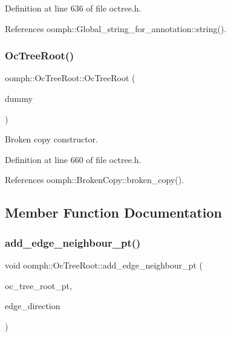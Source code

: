 Definition at line 636 of file octree.\+h.



References oomph\+::\+Global\+\_\+string\+\_\+for\+\_\+annotation\+::string().

\mbox{\label{classoomph_1_1OcTreeRoot_aa32ff5989a11da4c0a6f884f81833ef9}} 
\subsubsection{\texorpdfstring{Oc\+Tree\+Root()}{OcTreeRoot()}\hspace{0.1cm}{\footnotesize\ttfamily [2/2]}}
{\footnotesize\ttfamily oomph\+::\+Oc\+Tree\+Root\+::\+Oc\+Tree\+Root (\begin{DoxyParamCaption}\item[{const \hyperlink{classoomph_1_1OcTreeRoot}{Oc\+Tree\+Root} \&}]{dummy }\end{DoxyParamCaption})\hspace{0.3cm}{\ttfamily [inline]}}



Broken copy constructor. 



Definition at line 660 of file octree.\+h.



References oomph\+::\+Broken\+Copy\+::broken\+\_\+copy().



\subsection{Member Function Documentation}
\mbox{\label{classoomph_1_1OcTreeRoot_a92ccf3b396de331440c5dcba2e024317}} 
\subsubsection{\texorpdfstring{add\+\_\+edge\+\_\+neighbour\+\_\+pt()}{add\_edge\_neighbour\_pt()}}
{\footnotesize\ttfamily void oomph\+::\+Oc\+Tree\+Root\+::add\+\_\+edge\+\_\+neighbour\+\_\+pt (\begin{DoxyParamCaption}\item[{\hyperlink{classoomph_1_1TreeRoot}{Tree\+Root} $\ast$}]{oc\+\_\+tree\+\_\+root\+\_\+pt,  }\item[{const unsigned \&}]{edge\+\_\+direction }\end{DoxyParamCaption})\hspace{0.3cm}{\ttfamily [inline]}}



